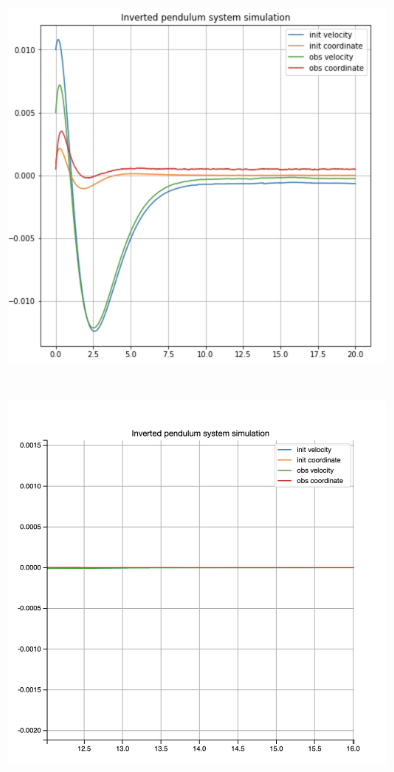 \documentclass[a4paper,11pt]{article}
\makeatletter
\newcommand{\problemquestion}[1]{\gdef\@problemquestion{#1}}%
\newcommand{\problemsolution}[1]{\gdef\@problemsolution{#1}}%
\theoremstyle{mytheor}
\makeatother
\begin{document}
\includegraphics[width=10cm, height=10cm]{G.png}



\begin{problem}
  \problemquestion{What happens to the state estimation and control system?}
  \problemsolution{If we crop section from 12 to 14 we can see that noise does not allow to converge to 0, but it almost does not affect time to converge to "near zero" values it is 10.0 for both plots}
\end{problem}
\includegraphics[width=10cm, height=10cm]{G_1.png}
\end{document}
